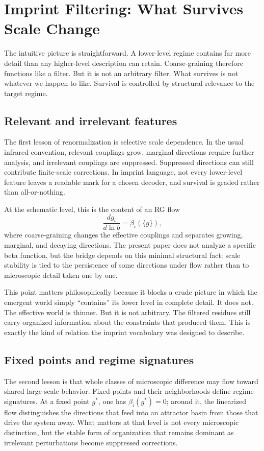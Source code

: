 \documentclass[12pt,a4paper]{article}
\begin{document}
\section{Imprint Filtering: What Survives Scale Change}

The intuitive picture is straightforward. A lower-level regime contains far more detail than any higher-level description can retain. Coarse-graining therefore functions like a filter. But it is not an arbitrary filter. What survives is not whatever we happen to like. Survival is controlled by structural relevance to the target regime.

\subsection{Relevant and irrelevant features}

The first lesson of renormalization is selective scale dependence. In
the usual infrared convention, relevant couplings grow, marginal
directions require further analysis, and irrelevant couplings are
suppressed. Suppressed directions can still contribute finite-scale
corrections. In imprint language, not every lower-level feature leaves a
readable mark for a chosen decoder, and survival is graded rather than
all-or-nothing.

At the schematic level, this is the content of an RG flow
\[
\frac{d g_i}{d \ln b} = \beta_i(\{g\}),
\]
where coarse-graining changes the effective couplings and separates growing, marginal, and decaying directions. The present paper does not analyze a specific beta function, but the bridge depends on this minimal structural fact: scale stability is tied to the persistence of some directions under flow rather than to microscopic detail taken one by one.

This point matters philosophically because it blocks a crude picture in which the emergent world simply ``contains'' its lower level in complete detail. It does not. The effective world is thinner. But it is not arbitrary. The filtered residues still carry organized information about the constraints that produced them. This is exactly the kind of relation the imprint vocabulary was designed to describe.

\subsection{Fixed points and regime signatures}

The second lesson is that whole classes of microscopic difference may flow toward shared large-scale behavior. Fixed points and their neighborhoods define regime signatures. At a fixed point \(g^\ast\), one has \(\beta_i(g^\ast)=0\); around it, the linearized flow distinguishes the directions that feed into an attractor basin from those that drive the system away. What matters at that level is not every microscopic distinction, but the stable form of organization that remains dominant as irrelevant perturbations become suppressed corrections.
\end{document}
